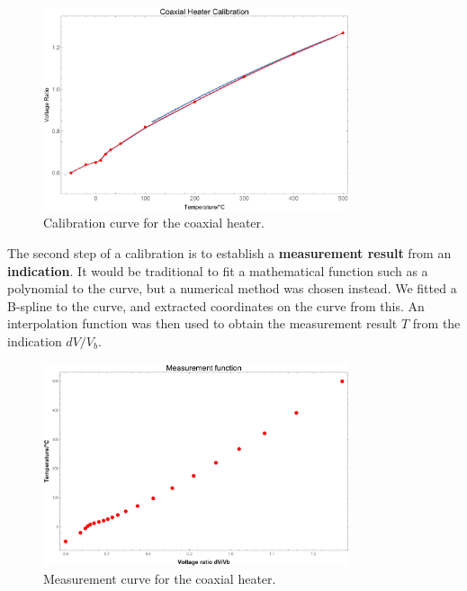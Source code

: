 \begin{figure}
	\centering
	\includegraphics[width=0.8\textwidth]{./Figures/2019_07_12 B-spline fit CPlot.pdf}
	\decoRule
	\caption[Calibration curve of the coaxial heater]{Calibration curve for the coaxial heater.}	
	\label{fig:CalibrationCurve}
\end{figure}

The second step of a calibration is to establish a \textbf{measurement result} from an
\textbf{indication}. It would be traditional to fit a mathematical function such as a
polynomial to the curve, but a numerical method was chosen instead. We fitted a
B-spline to the curve, and extracted coordinates on the curve from this. An
interpolation function was then used to obtain the measurement result \(T\) from
the indication \(dV/V_b\).

\begin{figure}
	\centering
	\includegraphics[width=0.8\textwidth]{./Figures/2019_07_12 B-spline fit PPlot.pdf}
	\decoRule
	\caption[Measurement curve of the coaxial heater]{Measurement curve for the coaxial heater.}	
	\label{fig:MeasurementCurve}
\end{figure}

